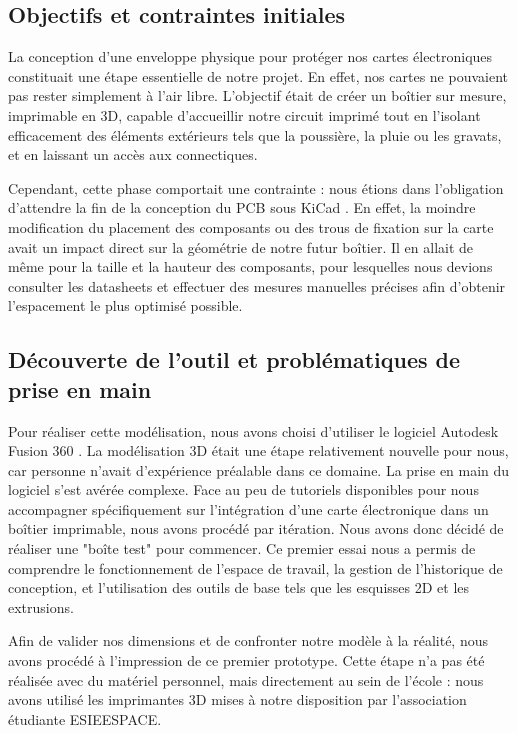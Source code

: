 \subsection{Objectifs et contraintes initiales}


La conception d'une enveloppe physique pour protéger nos cartes électroniques constituait une étape essentielle de notre projet. En effet, nos cartes ne pouvaient pas rester simplement à l'air libre. L'objectif était de créer un boîtier sur mesure, imprimable en 3D, capable d'accueillir notre circuit imprimé tout en l'isolant efficacement des éléments extérieurs tels que la poussière, la pluie ou les gravats, et en laissant un accès aux connectiques.

Cependant, cette phase comportait une contrainte : nous étions dans l'obligation d'attendre la fin de la conception du PCB sous KiCad \cite{KiCad}. En effet, la moindre modification du placement des composants ou des trous de fixation sur la carte avait un impact direct sur la géométrie de notre futur boîtier. Il en allait de même pour la taille et la hauteur des composants, pour lesquelles nous devions consulter les datasheets et effectuer des mesures manuelles précises afin d'obtenir l'espacement le plus optimisé possible.


\subsection{Découverte de l'outil et problématiques de prise en main}


Pour réaliser cette modélisation, nous avons choisi d'utiliser le logiciel Autodesk Fusion 360 \cite{Fusion360}. La modélisation 3D était une étape relativement nouvelle pour nous, car personne n'avait d'expérience préalable dans ce domaine. 
La prise en main du logiciel s'est avérée complexe. Face au peu de tutoriels disponibles pour nous accompagner spécifiquement sur l'intégration d'une carte électronique dans un boîtier imprimable, nous avons procédé par itération. Nous avons donc décidé de réaliser une "boîte test" pour commencer. Ce premier essai nous a permis de comprendre le fonctionnement de l'espace de travail, la gestion de l'historique de conception, et l'utilisation des outils de base tels que les esquisses 2D et les extrusions.

Afin de valider nos dimensions et de confronter notre modèle à la réalité, nous avons procédé à l'impression de ce premier prototype. Cette étape n'a pas été réalisée avec du matériel personnel, mais directement au sein de l'école : nous avons utilisé les imprimantes 3D mises à notre disposition par l'association étudiante ESIEESPACE.


